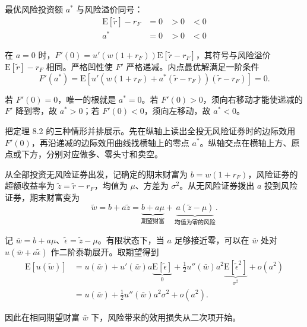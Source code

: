 \begin{tcolorbox}[knowledge]
 最优风险投资额 $a^*$ 与风险溢价同号：
\[
 \begin{array}{c|ccc}
 \mathrm E[\tilde r]-r_F&=0&>0&<0\\\hline
 a^*&=0&>0&<0
 \end{array}
\]
\end{tcolorbox}
\begin{solution}[label-content={证明},blank-type=none]
在 $a=0$ 时，$F'(0)=u'(w(1+r_F))\mathrm E[\tilde r-r_F]$，其符号与风险溢价 $\mathrm E[\tilde r]-r_F$ 相同。严格凹性使 $F'$ 严格递减。内点最优解满足一阶条件
\[
 F'(a^*)=\mathrm E\!\left[
 u'\!\left(w(1+r_F)+a^*(\tilde r-r_F)\right)(\tilde r-r_F)\right]=0.
\]

若 $F'(0)=0$，唯一的根就是 $a^*=0$。若 $F'(0)>0$，须向右移动才能使递减的 $F'$ 降到零，故 $a^*>0$；若 $F'(0)<0$，须向左移动，故 $a^*<0$。
\end{solution}

 把定理 8.2 的三种情形并排展示。先在纵轴上读出全投无风险证券时的边际效用 $F'(0)$，再沿递减的边际效用曲线找横轴上的零点 $a^*$。纵轴交点在横轴上方、原点或下方，分别对应做多、零头寸和卖空。


\begin{tcolorbox}[knowledge,title=小额投资的收益与风险成本]
从全部投资无风险证券出发，记确定的期末财富为 $b=w(1+r_F)$，风险证券的超额收益率为 $\widetilde z=\tilde r-r_F$，均值为 $\mu$、方差为 $\sigma^2$。从无风险证券拨出 $a$ 投到风险证券，期末财富变为
\[
 \tilde w=b+a\widetilde z
 =\underbrace{b+a\mu}_{\text{期望财富}}
   +\underbrace{a(\widetilde z-\mu)}_{\text{均值为零的风险}}.
\]

记 $\bar w=b+a\mu$、$\widetilde\epsilon=\widetilde z-\mu$。有限状态下，当 $a$ 足够接近零，可以在 $\bar w$ 处对 $u(\bar w+a\widetilde\epsilon)$ 作二阶泰勒展开。取期望得到
\[
 \begin{aligned}
 \mathrm E[u(\tilde w)]
 &=u(\bar w)+u'(\bar w)a\underbrace{\mathrm E[\widetilde\epsilon]}_{0}
   +\tfrac12 u''(\bar w)a^2
    \underbrace{\mathrm E[\widetilde\epsilon^2]}_{\sigma^2}
   +o(a^2)\\
 &=u(\bar w)+\tfrac12 u''(\bar w)a^2\sigma^2+o(a^2).
 \end{aligned}
\]

因此在相同期望财富 $\bar w$ 下，风险带来的效用损失从二次项开始。
\end{tcolorbox}

